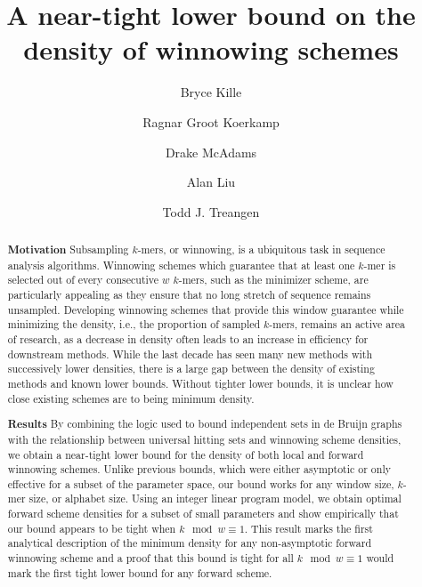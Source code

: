 \documentclass{article}
\newcommand{\kmer}{{$k$-mer}}
\newcommand{\kmers}{{$k$-mers}}
\begin{document}
\title{A near-tight lower bound on the density of winnowing schemes}

\author[1,*]{Bryce Kille}
\author[2,*]{Ragnar Groot Koerkamp}
\author[1]{Drake McAdams}
\author[1]{Alan Liu}
\author[1,3]{Todd J. Treangen}


\renewcommand\Affilfont{\footnotesize}


\maketitle


\begin{abstract}
\textbf{Motivation}
Subsampling \kmers{}, or winnowing, is a ubiquitous task in sequence analysis algorithms. Winnowing schemes which guarantee that at least one \kmer{} is selected out of every consecutive $w$ \kmers{}, such as the minimizer scheme, are particularly appealing as they ensure that no long stretch of sequence remains unsampled. Developing winnowing schemes that provide this window guarantee while minimizing the density, i.e., the proportion of sampled \kmers{}, remains an active area of research, as a decrease in density often leads to an increase in efficiency for downstream methods. While the last decade has seen many new methods with successively lower densities, there is a large gap between the density of existing methods and known lower bounds. Without tighter lower bounds, it is unclear how close existing schemes are to being minimum density.   

\textbf{Results}
By combining the logic used to bound independent sets in de Bruijn graphs with the relationship between universal hitting sets and winnowing scheme densities, we obtain a near-tight lower bound for the density of both local and forward winnowing schemes. Unlike previous bounds, which were either asymptotic or only effective for a subset of the parameter space, our bound works for any window size, \kmer{} size, or alphabet size. Using an integer linear program model, we obtain optimal forward scheme densities for a subset of small parameters and show empirically that our bound appears to be tight when $k\mod w \equiv 1$.  This result marks the first analytical description of the minimum density for any non-asymptotic forward winnowing scheme and a proof that this bound is tight for all  $k\mod w \equiv 1$ would mark the first tight lower bound for any forward scheme.
\end{abstract}
\end{document}
